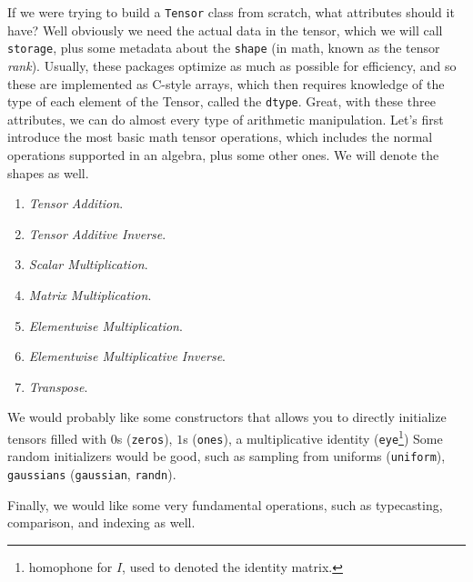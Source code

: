 \documentclass{article}
\begin{document}
  If we were trying to build a \texttt{Tensor} class from scratch, what attributes should it have? Well obviously we need the actual data in the tensor, which we will call \texttt{storage}, plus some metadata about the \texttt{shape} (in math, known as the tensor \textit{rank}). Usually, these packages optimize as much as possible for efficiency, and so these are implemented as C-style arrays, which then requires knowledge of the type of each element of the Tensor, called the \texttt{dtype}. Great, with these three attributes, we can do almost every type of arithmetic manipulation. Let's first introduce the most basic math tensor operations, which includes the normal operations supported in an algebra, plus some other ones. We will denote the shapes as well. 
  \begin{enumerate}
    \item \textit{Tensor Addition}. 
    \item \textit{Tensor Additive Inverse}. 
    \item \textit{Scalar Multiplication}. 
    \item \textit{Matrix Multiplication}. 
    \item \textit{Elementwise Multiplication}. 
    \item \textit{Elementwise Multiplicative Inverse}.  
    \item \textit{Transpose}. 
  \end{enumerate} 

  We would probably like some constructors that allows you to directly initialize tensors filled with $0$s (\texttt{zeros}), $1$s (\texttt{ones}), a multiplicative identity (\texttt{eye}\footnote{homophone for $I$, used to denoted the identity matrix.}) Some random initializers would be good, such as sampling from uniforms (\texttt{uniform}), \texttt{gaussians} (\texttt{gaussian}, \texttt{randn}). 

  Finally, we would like some very fundamental operations, such as typecasting, comparison, and indexing as well. 
\end{document}
